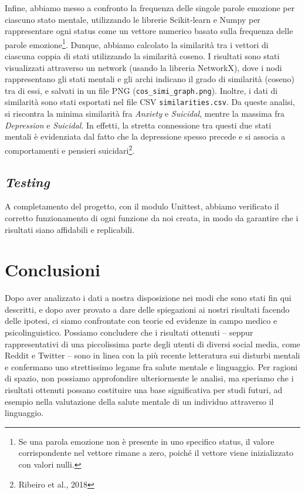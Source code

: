 \documentclass[11pt]{article}
\begin{document}
Infine, abbiamo messo a confronto la frequenza delle singole parole emozione per ciascuno stato mentale, utilizzando le librerie Scikit-learn e Numpy per rappresentare ogni status come un vettore numerico basato sulla frequenza delle parole emozione\footnote{Se una parola emozione non è presente in uno specifico status, il valore corrispondente nel vettore rimane a zero, poiché il vettore viene inizializzato con valori nulli.}. Dunque, abbiamo calcolato la similarità tra i vettori di ciascuna coppia di stati utilizzando la similarità coseno. I risultati sono stati visualizzati attraverso un network (usando la libreria NetworkX), dove i nodi rappresentano gli stati mentali e gli archi indicano il grado di similarità (coseno) tra di essi, e salvati in un file PNG (\texttt{cos\_simi\_graph.png}). Inoltre, i dati di similarità sono stati esportati nel file CSV \texttt{similarities.csv}. Da queste analisi, si riscontra la minima similarità fra \textit{Anxiety} e \textit{Suicidal}, mentre la massima fra \textit{Depression} e \textit{Suicidal}. In effetti, la stretta connessione tra questi due stati mentali è evidenziata dal fatto che la depressione spesso precede e si associa a comportamenti e pensieri suicidari\footnote{Ribeiro et al., 2018}. 

\subsection{\textit{Testing}}
\label{ssec:layout}

A completamento del progetto, con il modulo Unittest, abbiamo verificato il corretto funzionamento di ogni funzione da noi creata, in modo da garantire che i risultati siano affidabili e replicabili. 

\section{Conclusioni}

Dopo aver analizzato i dati a nostra disposizione nei modi che sono stati fin qui descritti, e dopo aver provato a dare delle spiegazioni ai nostri risultati facendo delle ipotesi, ci siamo confrontate con teorie ed evidenze in campo medico e psicolinguistico. Possiamo concludere che i risultati ottenuti – seppur rappresentativi di una piccolissima parte degli utenti di diversi social media, come Reddit e Twitter – sono in linea con la più recente letteratura sui disturbi mentali e confermano uno strettissimo legame fra salute mentale e linguaggio. Per ragioni di spazio, non possiamo approfondire ulteriormente le analisi, ma speriamo che i risultati ottenuti possano costituire una base significativa per studi futuri, ad esempio nella valutazione della salute mentale di un individuo attraverso il linguaggio. 
\end{document}
